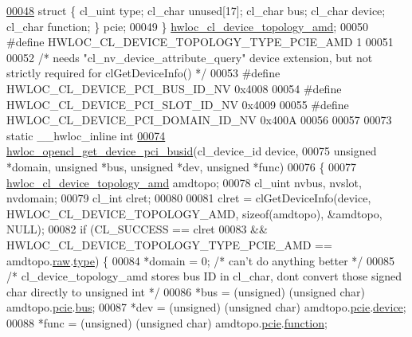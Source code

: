 \begin{DoxyCode}
\hyperlink{a00322_ac8650d7eea96eef290481fee980d1d47}{00048}     \textcolor{keyword}{struct }\{ cl\_uint type; cl\_char unused[17]; cl\_char bus; cl\_char device; cl\_char \textcolor{keyword}{function}; \} pcie;
00049 \} \hyperlink{a00322}{hwloc\_cl\_device\_topology\_amd};
00050 \textcolor{preprocessor}{#define HWLOC\_CL\_DEVICE\_TOPOLOGY\_TYPE\_PCIE\_AMD 1}
00051 
00052 \textcolor{comment}{/* needs "cl\_nv\_device\_attribute\_query" device extension, but not strictly required for clGetDeviceInfo() 
      */}
00053 \textcolor{preprocessor}{#define HWLOC\_CL\_DEVICE\_PCI\_BUS\_ID\_NV 0x4008}
00054 \textcolor{preprocessor}{#define HWLOC\_CL\_DEVICE\_PCI\_SLOT\_ID\_NV 0x4009}
00055 \textcolor{preprocessor}{#define HWLOC\_CL\_DEVICE\_PCI\_DOMAIN\_ID\_NV 0x400A}
00056 
00057 
00073 \textcolor{keyword}{static} \_\_hwloc\_inline \textcolor{keywordtype}{int}
\hyperlink{a00218_gab89e4d20f8a353299351b41849e35ac9}{00074} \hyperlink{a00218_gab89e4d20f8a353299351b41849e35ac9}{hwloc\_opencl\_get\_device\_pci\_busid}(cl\_device\_id device,
00075                                \textcolor{keywordtype}{unsigned} *domain, \textcolor{keywordtype}{unsigned} *bus, \textcolor{keywordtype}{unsigned} *dev, \textcolor{keywordtype}{unsigned} *func)
00076 \{
00077         \hyperlink{a00322}{hwloc\_cl\_device\_topology\_amd} amdtopo;
00078         cl\_uint nvbus, nvslot, nvdomain;
00079         cl\_int clret;
00080 
00081         clret = clGetDeviceInfo(device, HWLOC\_CL\_DEVICE\_TOPOLOGY\_AMD, \textcolor{keyword}{sizeof}(amdtopo), &amdtopo, NULL);
00082         \textcolor{keywordflow}{if} (CL\_SUCCESS == clret
00083             && HWLOC\_CL\_DEVICE\_TOPOLOGY\_TYPE\_PCIE\_AMD == amdtopo.\hyperlink{a00322_ab3b58c076f09a6f66c3bef0288add64a}{raw}.\hyperlink{a00322_a8ec4ea89b862bb271845b48063f332b4}{type}) \{
00084                 *domain = 0; \textcolor{comment}{/* can't do anything better */}
00085                 \textcolor{comment}{/* cl\_device\_topology\_amd stores bus ID in cl\_char, dont convert those signed char directly
       to unsigned int */}
00086                 *bus = (unsigned) (\textcolor{keywordtype}{unsigned} \textcolor{keywordtype}{char}) amdtopo.\hyperlink{a00322_abd362258740a00880a5598deb5a3e598}{pcie}.\hyperlink{a00322_a4a23e3cc034b7ab105cab0e863dcab69}{bus};
00087                 *dev = (unsigned) (\textcolor{keywordtype}{unsigned} \textcolor{keywordtype}{char}) amdtopo.\hyperlink{a00322_abd362258740a00880a5598deb5a3e598}{pcie}.\hyperlink{a00322_a017033a953d71455b067007cabb92e9c}{device};
00088                 *func = (unsigned) (\textcolor{keywordtype}{unsigned} \textcolor{keywordtype}{char}) amdtopo.\hyperlink{a00322_abd362258740a00880a5598deb5a3e598}{pcie}.\hyperlink{a00322_a77a67ac73cff98d330ef7258b240bac3}{function};

\end{DoxyCode}
